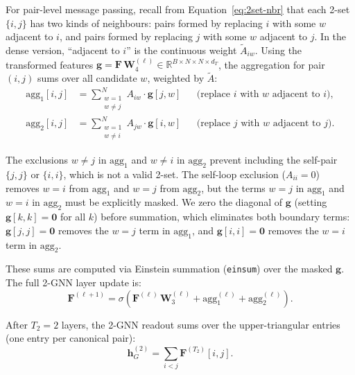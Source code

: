 \documentclass[12pt,a4paper]{article}
\begin{document}
For pair-level message passing, recall from Equation~\eqref{eq:2set-nbr} that each 2-set $\{i, j\}$ has two kinds of neighbours: pairs formed by replacing $i$ with some $w$ adjacent to $i$, and pairs formed by replacing $j$ with some $w$ adjacent to $j$. In the dense version, ``adjacent to $i$'' is the continuous weight $\tilde{A}_{iw}$. Using the transformed features $\mathbf{g} = \mathbf{F}\,\mathbf{W}_4^{(\ell)} \in \mathbb{R}^{B \times N \times N \times d_T}$, the aggregation for pair $(i,j)$ sums over all candidate $w$, weighted by $\tilde{A}$:
\begin{align}
  \text{agg}_1[i,j] &= \sum_{\substack{w=1 \\ w \neq j}}^{N} A_{iw} \cdot \mathbf{g}[j,w] & &\text{(replace } i \text{ with } w \text{ adjacent to } i\text{)}, \label{eq:dense-2gnn-agg1} \\
  \text{agg}_2[i,j] &= \sum_{\substack{w=1 \\ w \neq i}}^{N} A_{jw} \cdot \mathbf{g}[i,w] & &\text{(replace } j \text{ with } w \text{ adjacent to } j\text{)}. \label{eq:dense-2gnn-agg2}
\end{align}

The exclusions $w \neq j$ in $\text{agg}_1$ and $w \neq i$ in $\text{agg}_2$ prevent including the self-pair $\{j, j\}$ or $\{i, i\}$, which is not a valid 2-set. The self-loop exclusion ($A_{ii} = 0$) removes $w = i$ from $\text{agg}_1$ and $w = j$ from $\text{agg}_2$, but the terms $w = j$ in $\text{agg}_1$ and $w = i$ in $\text{agg}_2$ must be explicitly masked. We zero the diagonal of $\mathbf{g}$ (setting $\mathbf{g}[k, k] = \mathbf{0}$ for all $k$) before summation, which eliminates both boundary terms: $\mathbf{g}[j, j] = \mathbf{0}$ removes the $w = j$ term in $\text{agg}_1$, and $\mathbf{g}[i, i] = \mathbf{0}$ removes the $w = i$ term in $\text{agg}_2$.

These sums are computed via Einstein summation (\texttt{einsum}) over the masked $\mathbf{g}$. The full 2-GNN layer update is:
\begin{equation}
  \mathbf{F}^{(\ell+1)} = \sigma\!\left(\mathbf{F}^{(\ell)}\,\mathbf{W}_3^{(\ell)} + \text{agg}_1^{(\ell)} + \text{agg}_2^{(\ell)}\right).
  \label{eq:dense-2gnn-update}
\end{equation}

After $T_2 = 2$ layers, the 2-GNN readout sums over the upper-triangular entries (one entry per canonical pair):
\begin{equation}
  \mathbf{h}_G^{(2)} = \sum_{i < j} \mathbf{F}^{(T_2)}[i,j].
  \label{eq:dense-2gnn-pool}
\end{equation}
\end{document}
